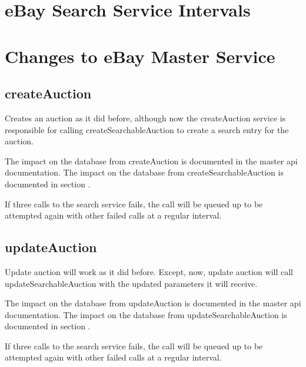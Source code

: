 \documentclass[12pt,a4paper]{article}
\begin{document}
\section{eBay Search Service Intervals}


\section{Changes to eBay Master Service}

\subsection{createAuction}

Creates an auction as it did before, although now the createAuction service is
responsible for calling createSearchableAuction to create a search entry for
the auction.

The impact on the database from createAuction is documented in the master api
documentation. The impact on the database from createSearchableAuction is
documented in section .

If three calls to the search service fails, the call will be queued up to be
attempted again with other failed calls at a regular interval.


\subsection{updateAuction}

Update auction will work as it did before. Except, now, update auction will
call updateSearchableAuction with the updated parameters it will receive.

The impact on the database from updateAuction is documented in the master api
documentation. The impact on the database from updateSearchableAuction is
documented in section .

If three calls to the search service fails, the call will be queued up to be
attempted again with other failed calls at a regular interval.
\end{document}

